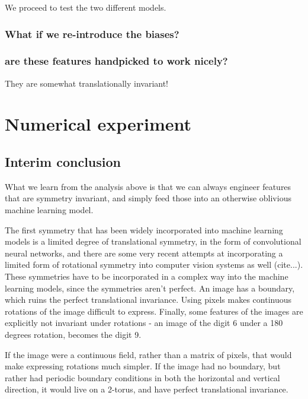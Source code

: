 \documentclass[twocolumn, prl]{revtex4-1}
\begin{document}
We proceed to test the two different models.

\subsubsection{What if we re-introduce the biases?}

\subsubsection{are these features handpicked to work nicely?}

They are somewhat translationally invariant!

\section{Numerical experiment}
\label{Sec:experiments}


\subsection{Interim conclusion}

What we learn from the analysis above is that we can always engineer features that are symmetry invariant, and simply feed those into an otherwise oblivious machine learning model.



The first symmetry that has been widely incorporated into machine learning models is a limited degree of translational symmetry, in the form of convolutional neural networks, and there are some very recent attempts at incorporating a limited form of rotational symmetry into computer vision systems as well (cite...). These symmetries have to be incorporated in a complex way into the machine learning models, since the symmetries aren't perfect. An image has a boundary, which ruins the perfect translational invariance. Using pixels makes continuous rotations of the image difficult to express. Finally, some features of the images are explicitly not invariant under rotations - an image of the digit 6 under a 180 degrees rotation, becomes the digit 9.

If the image were a continuous field, rather than a matrix of pixels, that would make expressing rotations much simpler. If the image had no boundary, but rather had periodic boundary conditions in both the horizontal and vertical direction, it would live on a 2-torus, and have perfect translational invariance.
\end{document}
